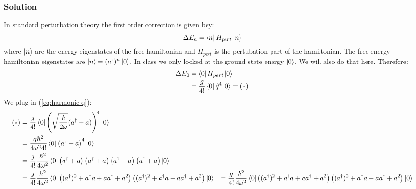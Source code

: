 \documentclass{article}
\begin{document}
	\subsubsection*{Solution}
	In standard perturbation theory the first order correction is given bey:
	\begin{equation*}
		\Delta E_n = \bra{n}H_{pert}\ket{n} 
	\end{equation*}
	where $\ket{n}$ are the energy eigenstates of the free hamiltonian and $H_{pert}$ is the pertubation part of the hamiltonian. The free energy hamiltonian eigenstates are $\ket{n}=(a^{\dagger})^n\ket{0}$. In class we only looked at the ground state energy $\ket{0}$. We will also do that here. Therefore:
	\begin{equation*}
		\begin{split}
			\Delta E_0 &= \bra{0}H_{pert}\ket{0}\\
			&= \frac{g}{4!}\bra{0}\hat{q}^4\ket{0}=(*)
		\end{split}
	\end{equation*}
	We plug in (\ref{eq:harmonic q}):
	\begin{equation*}
		\begin{split}
		 		(*)&=\frac{g}{4!}\bra{0}\left(\sqrt{\frac{\hbar}{2\omega}}(a^\dagger + a) \right) ^4\ket{0}\\
		 		&= \frac{g\hbar^2}{4\omega^2 4!}\bra{0}\left(a^\dagger + a\right) ^4\ket{0}\\
		 		&= \frac{g}{4!}\frac{\hbar^2}{4\omega^2 }\bra{0}\left(a^\dagger + a\right)\left(a^\dagger + a\right)\left(a^\dagger + a\right)\left(a^\dagger + a\right)\ket{0}\\
		 		&= \frac{g}{4!}\frac{\hbar^2}{4\omega^2 }\bra{0}\left((a^\dagger)^2+a^\dagger a + aa^\dagger + a^2\right)\left((a^\dagger)^2+a^\dagger a + aa^\dagger + a^2\right)\ket{0}
		 		&= \frac{g}{4!}\frac{\hbar^2}{4\omega^2 }\bra{0}\left((a^\dagger)^2+a^\dagger a + aa^\dagger + a^2\right)\left((a^\dagger)^2+a^\dagger a + aa^\dagger + a^2\right)\ket{0}
		\end{split}
	\end{equation*}
\end{document}

